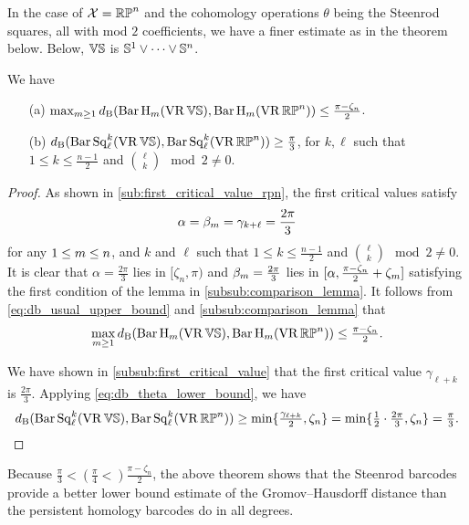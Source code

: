 \subsubsection{}

In the case of $\mathcal{X} = \mathbb{RP}^n$ and the cohomology operations $\theta$ being the Steenrod squares, all with mod $2$ coefficients, we have a finer estimate as in the theorem below.
Below, $\mathbb{V}\mathbb{S}$ is $\mathbb{S}^1\vee\dots\vee \mathbb{S}^n$.

\medskip\theorem
We have
\begin{itemize}
	\item[(a)] $\max_{m\geq 1}d_{\mathrm{B}}(\operatorname{Bar} \operatorname{H}_{m}(\operatorname{VR} \mathbb{V}\mathbb{S}), \operatorname{Bar} \operatorname{H}_{m}(\operatorname{VR} \mathbb{RP}^n))\leq \tfrac{\pi - \zeta_n}{2}$.
	\smallskip\item[(b)] $d_{\mathrm{B}}(\operatorname{Bar}\operatorname{Sq}^{k}_{\ell}(\operatorname{VR} \mathbb{V}\mathbb{S}), \operatorname{Bar}\operatorname{Sq}^{k}_{\ell}(\operatorname{VR} \mathbb{RP}^n))\geq \tfrac{\pi}{3}$, for $k,\ell$ such that $1\leq k \leq \frac{n-1}{2}$ and $\binom{\ell}{k} \mod 2 \neq 0$.
\end{itemize}

\begin{proof}
	As shown in \cref{sub:first_critical_value_rpn}, the first critical values satisfy
	$$
	\alpha = \beta_m = \gamma_{k+\ell} = \frac{2\pi}{3}
	$$
	for any $1 \leq m \leq n$, and $k$ and $\ell$ such that $1\leq k \leq \frac{n-1}{2}$ and $\binom{\ell}{k} \mod 2 \neq 0$.
	It is clear that $\alpha= \tfrac{2\pi}{3}$ lies in $[\zeta_n, \pi)$ and $\beta_m = \tfrac{2\pi}{3}$ lies in $[\alpha, \tfrac{\pi - \zeta_n}{2}+\zeta_m]$ satisfying the first condition of the lemma in \cref{subsub:comparison_lemma}.
	It follows from \cref{eq:db_usual_upper_bound} and \cref{subsub:comparison_lemma} that
	\[\max_{m\geq 1}d_{\mathrm{B}}(\operatorname{Bar} \operatorname{H}_{m}(\operatorname{VR} \mathbb{V}\mathbb{S}), \operatorname{Bar} \operatorname{H}_{m}(\operatorname{VR} \mathbb{RP}^n))\leq \tfrac{\pi - \zeta_n}{2}.\]

	We have shown in \cref{subsub:first_critical_value} that the first critical value $\gamma_{\ell+k}$ is $\tfrac{2\pi}{3}$.
	Applying \cref{eq:db_theta_lower_bound}, we have
	\[d_{\mathrm{B}}(\operatorname{Bar}\operatorname{Sq}^{k}_{\ell}(\operatorname{VR} \mathbb{V}\mathbb{S}), \operatorname{Bar}\operatorname{Sq}^{k}_{\ell}(\operatorname{VR} \mathbb{RP}^n))
	\geq \min\{\tfrac{\gamma_{\ell+k}}{2}, \zeta_n\}
	= \min\{\tfrac{1}{2}\cdot\tfrac{2\pi}{3}, \zeta_n\}
	= \tfrac{\pi}{3}.\]
\end{proof}

Because $\tfrac{\pi}{3} < (\tfrac{\pi}{4} <) \tfrac{\pi - \zeta_n}{2}$, the above theorem shows that the Steenrod barcodes provide a better lower bound estimate of the Gromov--Hausdorff distance than the persistent homology barcodes do in all degrees.
